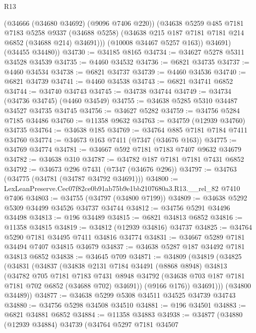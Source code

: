 \begin{lexlean}{R13}
\begin{coremodule}
            (@34666 (@34680 @34692) (@9096 @7406 @220))
            (@34638
              @5259
              @485
              @7181
              @7183
              @5258
              @9337
              (@34688 @5258)
              (@34638 @215 @187 @7181 @7181 @214 @6852 (@34688 @214) @34691)))
          (@10008 @34467 @5257 @163))
        @34691)
      (@34455 @34480))
@34730 := @34185 @8165
@34734 := @34627 @5278 @5311 @34528 @34539
@34735 := @4460 @34532
@34736 := @6821 @34735
@34737 := @4460 @34534
@34738 := @6821 @34737
@34739 := @4460 @34536
@34740 := @6821 @34739
@34741 := @4460 @34538
@34743 := @6821 @34741 @6852
@34744 := @34740 @34743
@34745 := @34738 @34744
@34749 := @34734 (@34736 @34745) (@4460 @34549)
@34755 := @34638 @5285 @5310 @34487 @34527 @34735 @34745
@34756 := @34627 @5282
@34759 := @34756 @5284 @7185 @34486
@34760 := @11358 @9632
@34763 := @34759 (@12939 @34760) @34735
@34764 := @34638 @185
@34769 := @34764 @885 @7181 @7184 @7411 @34760
@34774 := @34673 @163 @7411 (@7347 (@34676 @163))
@34775 := @34769 @34774
@34781 := @34667 @592 @7181 @7183 @7407 @9632 @34679
@34782 := @34638 @310
@34787 := @34782 @187 @7181 @7181 @7431 @6852
@34792 := @34673 @296 @7431 (@7347 (@34676 @296))
@34797 := @34763 (@34775 (@34781 (@34787 @34792 @34691)))
@34800 := LexLeanPreserve.Cec07f82ce0b91ab75b9e1bb2107680a3.R13.__rel_82 @7410 @7406
@34803 := @34755 (@34797 (@34800 @7199))
@34809 := @34638 @5292 @5309 @34499 @34526 @34737 @34744
@34812 := @34756 @5291 @34496 @34498
@34813 := @196 @34489
@34815 := @6821 @34813 @6852
@34816 := @11358 @34815
@34819 := @34812 (@12939 @34816) @34737
@34825 := @34764 @5290 @7181 @34495 @7411 @34816 @34774
@34831 := @34667 @5289 @7181 @34494 @7407 @34815 @34679
@34837 := @34638 @5287 @187 @34492 @7181 @34813 @6852
@34838 := @34645 @709
@34871 := @34809
    (@34819
      (@34825
        (@34831
          (@34837
            (@34838
              @2131
              @7184
              @34491
              (@8868 @8948)
              @34813
              (@34782
                @705
                @7181
                @7183
                @7431
                @8948
                @34792
                (@34638 @703 @187 @7181 @7181 @702 @6852 (@34688 @702) @34691))
              (@9166 @176))
            @34691)))
      (@34800 @34489))
@34877 := @34638 @5299 @5308 @34511 @34525 @34739 @34743
@34880 := @34756 @5298 @34508 @34510
@34881 := @196 @34501
@34883 := @6821 @34881 @6852
@34884 := @11358 @34883
@34938 := @34877
    (@34880
      (@12939 @34884)
      @34739
      (@34764
        @5297
        @7181
        @34507

\end{coremodule}
\end{lexlean}
